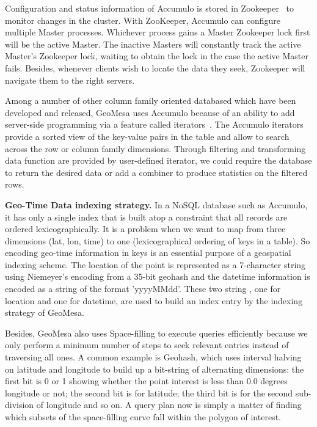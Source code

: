 \documentclass{acm_proc_article-sp}
\begin{document}
\setlength{\parindent}{0.7cm} Configuration and status information of Accumulo is stored in Zookeeper~\cite{zookeeper,zookeeperbook} to monitor changes in the cluster. With ZooKeeper, Accumulo can configure multiple Master processes. Whichever process gains a Master Zookeeper lock first will be the active Master. The inactive Masters will constantly track the active Master's Zookeeper lock, waiting to obtain the lock in the case the active Master fails. Besides, whenever clients wish to locate the data they seek, Zookeeper will navigate them to the right servers.

\setlength{\parindent}{0.7cm} Among a number of other column family oriented databased which have been developed and released, GeoMesa uses Accumulo because of an ability to add server-side programming via a feature called iterators~\cite{accumuloierator}. The Accumulo iterators provide a sorted view of the key-value pairs in the table and allow to search across the row or column family dimensions.  Through filtering and transforming data function are provided by user-defined iterator, we could require the database to return the desired data or add a combiner to produce statistics on the filtered rows. 

\textbf{Geo-Time Data indexing strategy.} In a NoSQL database such as Accumulo, it has only a single index that is built atop a constraint that all records are ordered lexicographically. It is a problem when we want to map from three dimensions (lat, lon, time) to one (lexicographical ordering of keys in a table). So encoding geo-time information in keys is an essential purpose of a geospatial indexing scheme. The location of the point is represented as a 7-character string using Niemeyer's encoding from a 35-bit geohash and the datetime information is encoded as a string of the format 'yyyyMMdd'. These two string , one for location and one for datetime, are used to build an index entry by the indexing strategy of GeoMesa.

\setlength{\parindent}{0.7cm} Besides, GeoMesa also uses Space-filling to execute queries efficiently because we only perform a minimum number of steps to seek relevant entries instead of traversing all ones. A common example is Geohash, which uses interval halving on latitude and longitude to build up a bit-string of alternating dimensions: the first bit is 0 or 1 showing whether the point interest is less than 0.0 degrees longitude or not; the second bit is for latitude; the third bit is for the second sub-division of longitude and so on.  A query plan now is simply a matter of finding which subsets of the space-filling curve fall within the polygon of interest.
\end{document}
